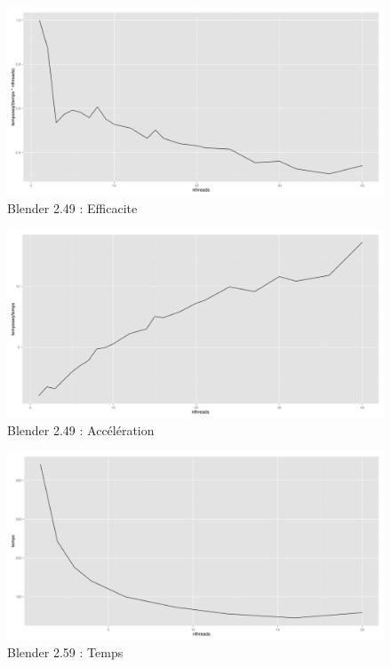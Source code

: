 \documentclass[a4paper,11pt]{article}
\begin{document}
\begin{figure}[htbp]
  \centering
  \includegraphics[scale=0.35]{img/blender1_efficacite.png}
  \caption{Blender 2.49 : Efficacite}
\end{figure}

\begin{figure}[htbp]
  \centering
  \includegraphics[scale=0.35]{img/blender1_acceleration.png}
  \caption{Blender 2.49 : Accélération}
\end{figure}

\begin{figure}[htbp]
  \centering
  \includegraphics[scale=0.35]{img/blender2_temps.png}
  \caption{Blender 2.59 : Temps}
\end{figure}
\end{document}
